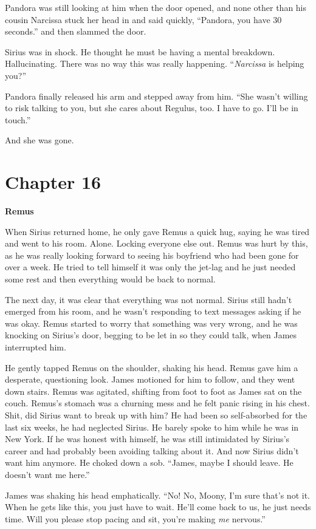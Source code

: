 \documentclass[12pt,twoside,openright]{memoir}
\begin{document}
Pandora was still looking at him when the door opened, and none other than his cousin Narcissa stuck her head in and said quickly, ``Pandora, you have 30 seconds.'' and then slammed the door.

Sirius was in shock. He thought he must be having a mental breakdown. Hallucinating. There was no way this was really happening. ``\textit{Narcissa} is helping you?'' 

Pandora finally released his arm and stepped away from him. ``She wasn't willing to risk talking to you, but she cares about Regulus, too. I have to go. I'll be in touch.''

And she was gone.

\chapter*{Chapter 16}

\textbf{Remus} 

When Sirius returned home, he only gave Remus a quick hug, saying he was tired and went to his room. Alone. Locking everyone else out. Remus was hurt by this, as he was really looking forward to seeing his boyfriend who had been gone for over a week. He tried to tell himself it was only the jet-lag and he just needed some rest and then everything would be back to normal. 

The next day, it was clear that everything was not normal. Sirius still hadn't emerged from his room, and he wasn't responding to text messages asking if he was okay. Remus started to worry that something was very wrong, and he was knocking on Sirius's door, begging to be let in so they could talk, when James interrupted him.

He gently tapped Remus on the shoulder, shaking his head. Remus gave him a desperate, questioning look. James motioned for him to follow, and they went down stairs. Remus was agitated, shifting from foot to foot as James sat on the couch. Remus's stomach was a churning mess and he felt panic rising in his chest. Shit, did Sirius want to break up with him?
He had been so self-absorbed for the last six weeks, he had neglected Sirius. He barely spoke to him while he was in New York. If he was honest with himself, he was still intimidated by Sirius's career and had probably been avoiding talking about it. And now Sirius didn't want him anymore. He choked down a sob. ``James, maybe I should leave. He doesn't want me here.'' 

James was shaking his head emphatically. ``No! No, Moony, I'm sure that's not it. When he gets like this, you just have to wait. He'll come back to us, he just needs time. Will you please stop pacing and sit, you're making
\textit{me} nervous.''
\end{document}
